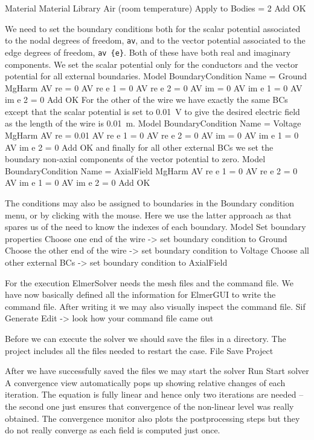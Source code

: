   Material
    Material Library
      Air (room temperature)
    Apply to Bodies = 2
    Add
    OK
\ttend

We need to set the boundary conditions both for the scalar potential associated to the nodal degrees of freedom, \texttt{av},
and to the vector potential associated to the edge degrees of freedom, \texttt{av \{e\}}.
Both of these have both real and imaginary components. 
We set the scalar potential only for the conductors and the vector potential for all external boundaries.
\ttbegin
Model
  BoundaryCondition
    Name = Ground 
    MgHarm
      AV re = 0
      AV re {e} 1 = 0
      AV re {e} 2 = 0
      AV im = 0
      AV im {e} 1 = 0
      AV im {e} 2 = 0
    Add
    OK
\ttend   
For the other of the wire we have exactly the same BCs except that the scalar potential is set to 0.01~V to give the desired
electric field as the length of the wire is 0.01~m. 
\ttbegin
Model
  BoundaryCondition
    Name = Voltage
    MgHarm
      AV re = 0.01
      AV re {e} 1 = 0
      AV re {e} 2 = 0
      AV im = 0
      AV im {e} 1 = 0
      AV im {e} 2 = 0
    Add
    OK
\ttend   
and finally for all other external BCs we set the boundary non-axial components of the vector potential to zero.
\ttbegin
Model
  BoundaryCondition
    Name = AxialField
    MgHarm
      AV re {e} 1 = 0
      AV re {e} 2 = 0
      AV im {e} 1 = 0
      AV im {e} 2 = 0
    Add
    OK
\ttend 


The conditions may also be assigned to boundaries in the Boundary condition menu, or 
by clicking with the mouse. Here we use the latter approach as that spares us of the 
need to know the indexes of each boundary.
\ttbegin
Model
  Set boundary properties
    Choose one end of the wire -> set boundary condition to Ground
    Choose the other end of the wire -> set boundary condition to Voltage
    Choose all other external BCs -> set boundary condition to AxialField
\ttend

For the execution 
ElmerSolver needs the mesh files and the command file. We have now basically defined
all the information for ElmerGUI to write the command file. After writing it we may also visually 
inspect the command file.
\ttbegin
Sif 
  Generate
  Edit -> look how your command file came out  
\ttend

Before we can execute the solver we should save the files in a directory. The project includes
all the files needed to restart the case.
\ttbegin
File 
  Save Project
\ttend

After we have successfully saved the files we may start the solver
\ttbegin
Run
  Start solver
\ttend
A convergence view automatically pops up showing relative changes of each iteration.
The equation is fully linear and hence only two iterations are needed -- the second 
one just ensures that convergence of the non-linear level was really obtained. 
The convergence monitor also plots the postprocessing steps but they do not really converge as each field is computed just once. 

